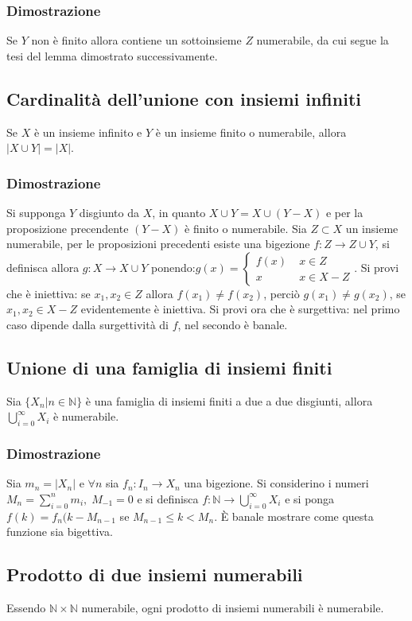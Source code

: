 \subsubsection{Dimostrazione}
Se $Y$ non \`e finito allora contiene un sottoinsieme $Z$ numerabile, da cui segue la tesi del lemma dimostrato successivamente.
\subsection{Cardinalit\`a dell'unione con insiemi infiniti}
Se $X$ \`e un insieme infinito e $Y$ \`e un insieme finito o numerabile, allora $|X\cup Y|=|X|$.
\subsubsection{Dimostrazione}
Si supponga $Y$ disgiunto da $X$, in quanto $X\cup Y=X\cup(Y-X)$ e per la proposizione precendente $(Y-X)$ \`e finito o numerabile. Sia $Z\subset X$ un insieme numerabile, per
le proposizioni precedenti esiste una bigezione $f:Z\rightarrow Z\cup Y$, si definisca allora $g:X\rightarrow X\cup Y$ ponendo:$
g(x)=\begin{cases}
f(x)\;&x\in Z\\
x\;&x\in X-Z
\end{cases}$. Si provi che \`e iniettiva: se $x_1, x_2\in Z$ allora $f(x_1)\neq f(x_2)$, perci\`o $g(x_1)\neq g(x_2)$, se $x_1, x_2\in X-Z$ evidentemente \`e iniettiva. Si 
provi ora che \`e surgettiva: nel primo caso dipende dalla surgettivit\`a di $f$, nel secondo \`e banale. 
\subsection{Unione di una famiglia di insiemi finiti}
Sia $\{X_n|n\in\mathbb{N}\}$ \`e una famiglia di insiemi finiti a due a due disgiunti, allora $\bigcup\limits_{i=0}^\infty X_i$ \`e numerabile.
\subsubsection{Dimostrazione}
Sia $m_n=|X_n|$ e $\forall n$ sia $f_n:I_n\rightarrow X_n$ una bigezione. Si considerino i numeri $M_n=\sum\limits_{i=0}^nm_i,\;M_{-1}=0$ e si definisca $f:\mathbb{N}
\rightarrow \bigcup\limits_{i=0}^\infty X_i$ e si ponga $f(k)=f_n(k-M_{n-1}$ se $M_{n-1}\le k<M_n$. \`E banale mostrare come questa funzione sia bigettiva. 
\subsection{Prodotto di due insiemi numerabili}
Essendo $\mathbb{N}\times\mathbb{N}$ numerabile, ogni prodotto di insiemi numerabili \`e numerabile.
